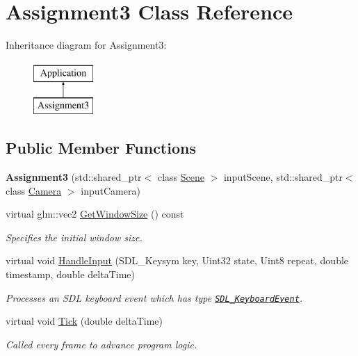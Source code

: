 \hypertarget{class_assignment3}{}\section{Assignment3 Class Reference}
\label{class_assignment3}
Inheritance diagram for Assignment3\+:\begin{figure}[H]
\begin{center}
\leavevmode
\includegraphics[height=2.000000cm]{class_assignment3}
\end{center}
\end{figure}
\subsection*{Public Member Functions}
\begin{DoxyCompactItemize}
\item 
\hypertarget{class_assignment3_adb8e9ac0681c600affc3370f5e5422b2}{}{\bfseries Assignment3} (std\+::shared\+\_\+ptr$<$ class \hyperlink{class_scene}{Scene} $>$ input\+Scene, std\+::shared\+\_\+ptr$<$ class \hyperlink{class_camera}{Camera} $>$ input\+Camera)\label{class_assignment3_adb8e9ac0681c600affc3370f5e5422b2}

\item 
virtual glm\+::vec2 \hyperlink{class_assignment3_a895e38d50717c935706a719f4368f5e8}{Get\+Window\+Size} () const 
\begin{DoxyCompactList}\small\item\em Specifies the initial window size. \end{DoxyCompactList}\item 
virtual void \hyperlink{class_assignment3_a1cc65ca321f39eb7092959b2dada8d31}{Handle\+Input} (S\+D\+L\+\_\+\+Keysym key, Uint32 state, Uint8 repeat, double timestamp, double delta\+Time)
\begin{DoxyCompactList}\small\item\em Processes an S\+D\+L keyboard event which has type \href{https://wiki.libsdl.org/SDL_KeyboardEvent}{\tt S\+D\+L\+\_\+\+Keyboard\+Event}. \end{DoxyCompactList}\item 
virtual void \hyperlink{class_assignment3_a11256b6e7b38ab24baa92729cfb8ffe2}{Tick} (double delta\+Time)
\begin{DoxyCompactList}\small\item\em Called every frame to advance program logic. \end{DoxyCompactList}\end{DoxyCompactItemize}
